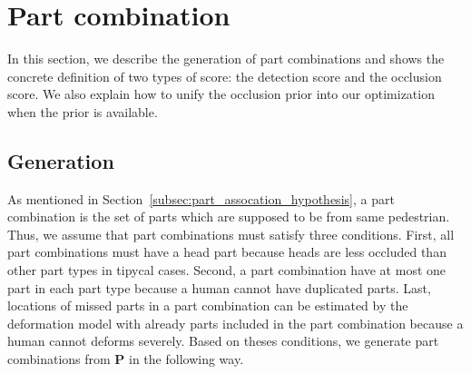 \documentclass[runningheads]{llncs}
\begin{document}
\section{Part combination}
\label{sec:part_combination}
In this section, we describe the generation of part combinations and shows the concrete definition of two types of score: the detection score and the occlusion score. We also explain how to unify the occlusion prior into our optimization when the prior is available.

\subsection{Generation}
\label{subsec:generation}
As mentioned in Section~\ref{subsec:part_assocation_hypothesis}, a part combination is the set of parts which are supposed to be from same pedestrian.
Thus, we assume that part combinations must satisfy three conditions.
First, all part combinations must have a head part because heads are less occluded than other part types in tipycal cases.
Second, a part combination have at most one part in each part type because a human cannot have duplicated parts.
Last, locations of missed parts in a part combination can be estimated by the deformation model with already parts included in the part combination because a human cannot deforms severely.
Based on theses conditions, we generate part combinations from $\mathbf{P}$ in the following way.
\end{document}
